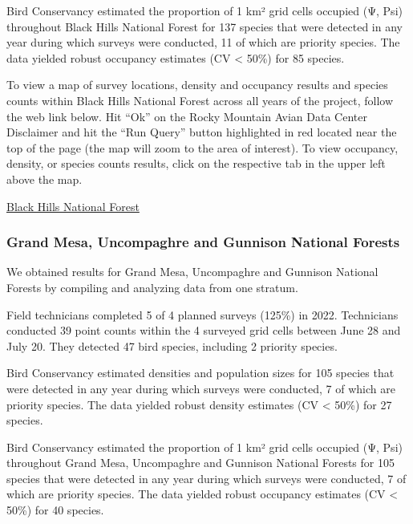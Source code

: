 \documentclass[
  letterpaper,
  DIV=11,
  numbers=noendperiod,
  oneside]{scrreprt}
\begin{document}
Bird Conservancy estimated the proportion of 1 km² grid cells occupied
(Ψ, Psi) throughout Black Hills National Forest for 137 species that
were detected in any year during which surveys were conducted, 11 of
which are priority species. The data yielded robust occupancy estimates
(CV \textless{} 50\%) for 85 species.

To view a map of survey locations, density and occupancy results and
species counts within Black Hills National Forest across all years of
the project, follow the web link below. Hit ``Ok'' on the Rocky Mountain
Avian Data Center Disclaimer and hit the ``Run Query'' button
highlighted in red located near the top of the page (the map will zoom
to the area of interest). To view occupancy, density, or species counts
results, click on the respective tab in the upper left above the map.

\href{http://www.rmbo.org/new_site/adc/QueryWindow.aspx\#N4IgzgrgDgpgTmALnAhoiBbEAuABCAIQBsUBjAa1wAkBLIosXAOTRoHsA7FI3AMTbgwkIAL5A===}{Black
Hills National Forest}

\hypertarget{grand-mesa-uncompaghre-and-gunnison-national-forests}{%
\subsubsection{Grand Mesa, Uncompaghre and Gunnison National
Forests}\label{grand-mesa-uncompaghre-and-gunnison-national-forests}}

We obtained results for Grand Mesa, Uncompaghre and Gunnison National
Forests by compiling and analyzing data from one stratum.

Field technicians completed 5 of 4 planned surveys (125\%) in 2022.
Technicians conducted 39 point counts within the 4 surveyed grid cells
between June 28 and July 20. They detected 47 bird species, including 2
priority species.

Bird Conservancy estimated densities and population sizes for 105
species that were detected in any year during which surveys were
conducted, 7 of which are priority species. The data yielded robust
density estimates (CV \textless{} 50\%) for 27 species.

Bird Conservancy estimated the proportion of 1 km² grid cells occupied
(Ψ, Psi) throughout Grand Mesa, Uncompaghre and Gunnison National
Forests for 105 species that were detected in any year during which
surveys were conducted, 7 of which are priority species. The data
yielded robust occupancy estimates (CV \textless{} 50\%) for 40 species.
\end{document}

